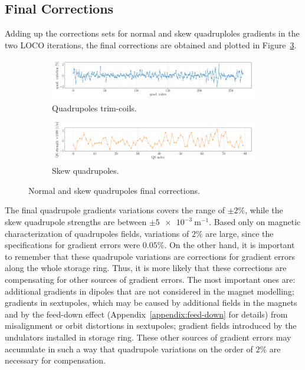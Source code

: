\subsection{Final Corrections}
Adding up the corrections sets for normal and skew quadruploles gradients in the two LOCO iterations, the final corrections are obtained and plotted in Figure~\ref{fig:loco_corrections_final}.
\begin{figure}
\centering
\begin{subfigure}[t]{1.0\textwidth}
\includegraphics[width=1.0\textwidth]{figures/loco_quad_corrections_errorbar_big.pdf}
    \caption{Quadrupoles trim-coils.}
    \label{subfig:quad_fit_final}
\end{subfigure}
 \begin{subfigure}[t]{1.0\textwidth}
\includegraphics[width=1.0\textwidth]{figures/loco_qs_corrections_errorbar_big.pdf}
    \caption{Skew quadrupoles.}
    \label{subfig:qs_fit_final}
\end{subfigure}
\caption{Normal and skew quadrupoles final corrections.}
\label{fig:loco_corrections_final}
\end{figure}

The final quadrupole gradients variations covers the range of $\pm 2\%$, while the skew quadrupole strengths are between $\pm \SI{5e-3}{\meter^{-1}}$. Based only on magnetic characterization of quadrupoles fields, variations of $2\%$ are large, since the specifications for gradient errors were $0.05\%$. On the other hand, it is important to remember that these quadrupole variations are corrections for gradient errors along the whole storage ring. Thus, it is more likely that these corrections are compensating for other sources of gradient errors. The most important ones are: additional gradients in dipoles that are not considered in the magnet modelling; gradients in sextupoles, which may be caused by additional fields in the magnets and by the feed-down effect (Appendix~\ref{appendix:feed-down} for details) from misalignment or orbit distortions in sextupoles; gradient fields introduced by the undulators installed in storage ring. These other sources of gradient errors may accumulate in such a way that quadrupole variations on the order of $2\%$ are necessary for compensation.

